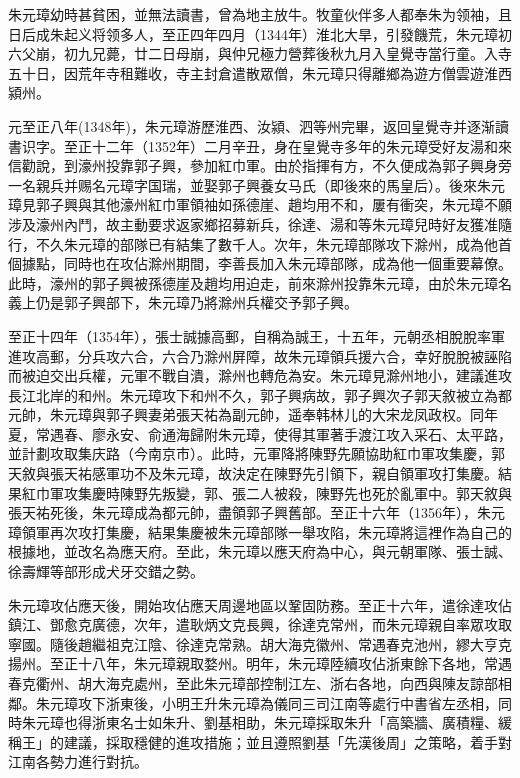 朱元璋幼時甚貧困，並無法讀書，曾為地主放牛。牧童伙伴多人都奉朱为领袖，且日后成朱起义将领多人，至正四年四月（1344年）淮北大旱，引發饑荒，朱元璋初六父崩，初九兄薨，廿二日母崩，與仲兄極力營葬後秋九月入皇覺寺當行童。入寺五十日，因荒年寺租難收，寺主封倉遣散眾僧，朱元璋只得離鄉為遊方僧雲遊淮西潁州。

元至正八年(1348年)，朱元璋游歷淮西、汝潁、泗等州完畢，返回皇覺寺并逐渐讀書识字。至正十二年（1352年）二月辛丑，身在皇覺寺多年的朱元璋受好友湯和來信勸說，到濠州投靠郭子興，參加紅巾軍。由於指揮有方，不久便成為郭子興身旁一名親兵并赐名元璋字国瑞，並娶郭子興養女马氏（即後來的馬皇后）。後來朱元璋見郭子興與其他濠州紅巾軍領袖如孫德崖、趙均用不和，屢有衝突，朱元璋不願涉及濠州內鬥，故主動要求返家鄉招募新兵，徐達、湯和等朱元璋兒時好友獲准隨行，不久朱元璋的部隊已有結集了數千人。次年，朱元璋部隊攻下滁州，成為他首個據點，同時也在攻佔滁州期間，李善長加入朱元璋部隊，成為他一個重要幕僚。此時，濠州的郭子興被孫德崖及趙均用迫走，前來滁州投靠朱元璋，由於朱元璋名義上仍是郭子興部下，朱元璋乃將滁州兵權交予郭子興。

至正十四年（1354年），張士誠據高郵，自稱為誠王，十五年，元朝丞相脫脫率軍進攻高郵，分兵攻六合，六合乃滁州屏障，故朱元璋領兵援六合，幸好脫脫被誣陷而被迫交出兵權，元軍不戰自潰，滁州也轉危為安。朱元璋見滁州地小，建議進攻長江北岸的和州。朱元璋攻下和州不久，郭子興病故，郭子興次子郭天敘被立為都元帥，朱元璋與郭子興妻弟張天祐為副元帥，遥奉韩林儿的大宋龙凤政权。同年夏，常遇春、廖永安、俞通海歸附朱元璋，使得其軍著手渡江攻入采石、太平路，並計劃攻取集庆路（今南京市）。此時，元軍降將陳野先願協助紅巾軍攻集慶，郭天敘與張天祐感軍功不及朱元璋，故決定在陳野先引領下，親自領軍攻打集慶。結果紅巾軍攻集慶時陳野先叛變，郭、張二人被殺，陳野先也死於亂軍中。郭天敘與張天祐死後，朱元璋成為都元帥，盡領郭子興舊部。至正十六年（1356年），朱元璋領軍再次攻打集慶，結果集慶被朱元璋部隊一舉攻陷，朱元璋將這裡作為自己的根據地，並改名為應天府。至此，朱元璋以應天府為中心，與元朝軍隊、張士誠、徐壽輝等部形成犬牙交錯之勢。

朱元璋攻佔應天後，開始攻佔應天周邊地區以鞏固防務。至正十六年，遣徐達攻佔鎮江、鄧愈克廣德，次年，遣耿炳文克長興，徐達克常州，而朱元璋親自率眾攻取寧國。隨後趙繼祖克江陰、徐達克常熟。胡大海克徽州、常遇春克池州，繆大亨克揚州。至正十八年，朱元璋親取婺州。明年，朱元璋陸續攻佔浙東餘下各地，常遇春克衢州、胡大海克處州，至此朱元璋部控制江左、浙右各地，向西與陳友諒部相鄰。朱元璋攻下浙東後，小明王升朱元璋為儀同三司江南等處行中書省左丞相，同時朱元璋也得浙東名士如朱升、劉基相助，朱元璋採取朱升「高築牆、廣積糧、緩稱王」的建議，採取穩健的進攻措施；並且遵照劉基「先漢後周」之策略，着手對江南各勢力進行對抗。

